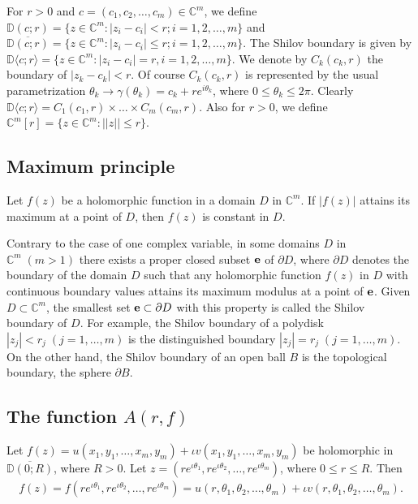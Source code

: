 \documentclass[11pt, reqno]{amsart}
\newcommand{\ol}{\overline}
\numberwithin{equation}{section}
\begin{document}
\vspace{1.2mm}

For $r>0$ and $c=(c_1,c_2,\ldots,c_m)\in\mathbb{C}^m$, we define 
$\mathbb{D}(c;r)=\{z\in\mathbb{C}^m: |z_i-c_i|<r; i=1,2,\ldots,m\}$ and $\ol{\mathbb{D}(c;r)}=\{z\in\mathbb{C}^m: |z_i-c_i|\leq r; i=1,2,\ldots,m\}$. The Shilov boundary is given by $\mathbb{D}\langle c;r\rangle=\{z\in\mathbb{C}^m: |z_i-c_i|=r, i=1,2,\ldots,m\}$.
 We denote by $C_k(c_k,r)$ the boundary of $|z_k-c_k|<r$. Of course $C_k(c_k,r)$ is represented by the usual parametrization $\theta_k\to \gamma(\theta_k)=c_k+re^{i\theta_k}$, where $0\leq \theta_k\leq 2\pi$. Clearly $\mathbb{D}\langle c;r\rangle=C_1(c_1,r)\times\ldots\times C_m(c_m,r)$. Also for $r>0$, we define $\mathbb{C}^m[r]=\{z\in\mathbb{C}^m: ||z||\leq r\}$.


\subsection{\bf{Maximum principle}} Let $f(z)$ be a holomorphic function in a domain $D$ in $\mathbb{C}^m$. If $|f(z)|$ attains its maximum at a point of $D$, then $f(z)$ is constant in $D$.

Contrary to the case of one complex variable, in some domains $D$ in $\mathbb{C}^m\;(m>1)$ there exists a proper closed subset ${\bf e}$ of $\partial D$, where $\partial D$ denotes the boundary of the domain $D$ such that any holomorphic function $f(z)$ in $D$ with continuous boundary values attains its maximum modulus at a point of ${\bf e}$. Given $D\subset \mathbb{C}^m$, the smallest set ${\bf e}\subset \partial D$ with this property is called the Shilov boundary of $D$. For example, the Shilov boundary of a polydisk $|z_j|< r_j\;(j=1,\ldots,m)$ is the distinguished boundary $|z_j|=r_j\;(j = 1,\ldots,m)$. On the other hand, the Shilov boundary of an open ball $B$ is the topological boundary, the sphere $\partial B$.

\subsection{\bf{The function $A(r,f)$}}
Let $f(z)=u(x_1,y_1,\ldots,x_m,y_m)+\iota v(x_1,y_1,\ldots,x_m,y_m)$ be holomorphic in $\ol{\mathbb{D}(0;R)}$, where $R>0$. Let $z=\left(re^{\iota \theta_1},re^{\iota \theta_2},\ldots,re^{\iota \theta_m}\right)$, where $0\leq r\leq R$. Then 
\begin{align*}
 f(z)=f\left(re^{\iota \theta_1},re^{\iota \theta_2},\ldots,re^{\iota \theta_m}\right)=u(r,\theta_1,\theta_2,\ldots,\theta_m)+\iota v(r,\theta_1,\theta_2,\ldots,\theta_m).
 \end{align*}
 
\end{document}

